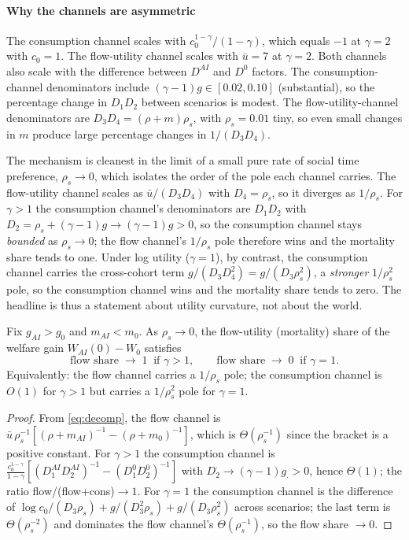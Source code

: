 \documentclass{_latex/house}
\begin{document}
\paragraph{Why the channels are asymmetric} The consumption channel scales with $c_0^{1-\gamma}/(1-\gamma)$, which equals $-1$ at $\gamma = 2$ with $c_0 = 1$. The flow-utility channel scales with $\bar u = 7$ at $\gamma = 2$. Both channels also scale with the difference between $D^{AI}$ and $D^0$ factors. The consumption-channel denominators include $(\gamma-1)g \in [0.02, 0.10]$ (substantial), so the percentage change in $D_1 D_2$ between scenarios is modest. The flow-utility-channel denominators are $D_3 D_4 = (\rho+m)\rho_s$, with $\rho_s = 0.01$ tiny, so even small changes in $m$ produce large percentage changes in $1/(D_3 D_4)$.

The mechanism is cleanest in the limit of a small pure rate of social time preference, $\rho_s\to0$, which isolates the order of the pole each channel carries. The flow-utility channel scales as $\bar u/(D_3 D_4)$ with $D_4=\rho_s$, so it diverges as $1/\rho_s$. For $\gamma>1$ the consumption channel's denominators are $D_1 D_2$ with $D_2=\rho_s+(\gamma-1)g\to(\gamma-1)g>0$, so the consumption channel stays \emph{bounded} as $\rho_s\to0$; the flow channel's $1/\rho_s$ pole therefore wins and the mortality share tends to one. Under log utility ($\gamma=1$), by contrast, the consumption channel carries the cross-cohort term $g/(D_3 D_4^2)=g/(D_3\rho_s^2)$, a \emph{stronger} $1/\rho_s^2$ pole, so the consumption channel wins and the mortality share tends to zero. The headline is thus a statement about utility curvature, not about the world.

\begin{proposition}
\label{prop:dominance}
Fix $g_{AI}>g_0$ and $m_{AI}<m_0$. As $\rho_s\to0$, the flow-utility (mortality) share of the welfare gain $W_{AI}(0)-W_0$ satisfies
\[
\text{flow share} \;\longrightarrow\; 1 \ \text{ if } \gamma>1, \qquad
\text{flow share} \;\longrightarrow\; 0 \ \text{ if } \gamma=1 .
\]
Equivalently: the flow channel carries a $1/\rho_s$ pole; the consumption channel is $O(1)$ for $\gamma>1$ but carries a $1/\rho_s^2$ pole for $\gamma=1$.
\end{proposition}

\begin{proof}
From \eqref{eq:decomp}, the flow channel is $\bar u\,\rho_s^{-1}[(\rho+m_{AI})^{-1}-(\rho+m_0)^{-1}]$, which is $\Theta(\rho_s^{-1})$ since the bracket is a positive constant. For $\gamma>1$ the consumption channel is $\frac{c_0^{1-\gamma}}{1-\gamma}[(D_1^{AI}D_2^{AI})^{-1}-(D_1^0 D_2^0)^{-1}]$ with $D_2^{\cdot}\to(\gamma-1)g_\cdot>0$, hence $\Theta(1)$; the ratio flow/(flow+cons)$\to1$. For $\gamma=1$ the consumption channel is the difference of $\log c_0/(D_3\rho_s)+g/(D_3^2\rho_s)+g/(D_3\rho_s^2)$ across scenarios; the last term is $\Theta(\rho_s^{-2})$ and dominates the flow channel's $\Theta(\rho_s^{-1})$, so the flow share $\to0$.
\end{proof}
\end{document}
